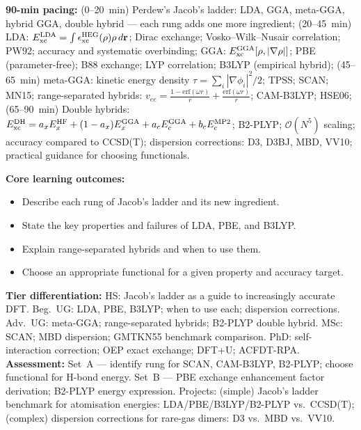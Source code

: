 \documentclass[11pt,a4paper]{article}
\begin{document}
\begin{tcolorbox}[chembox, title={Module~III.3 / L04: Overview of XC Functionals --- Jacob's Ladder}]
\textbf{90-min pacing:} (0--20~min) Perdew's Jacob's ladder: LDA, GGA, meta-GGA, hybrid GGA, double hybrid --- each rung adds one more ingredient; (20--45~min) LDA: $E_{\rm xc}^{\rm LDA}=\int\epsilon_{\rm xc}^{\rm HEG}(\rho)\rho\,d\mathbf{r}$; Dirac exchange; Vosko--Wilk--Nusair correlation; PW92; accuracy and systematic overbinding; GGA: $E_{\rm xc}^{\rm GGA}[\rho,|\nabla\rho|]$; PBE (parameter-free); B88 exchange; LYP correlation; B3LYP (empirical hybrid); (45--65~min) meta-GGA: kinetic energy density $\tau=\sum_i|\nabla\phi_i|^2/2$; TPSS; SCAN; MN15; range-separated hybrids: $v_{ee}=\tfrac{1-\text{erf}(\omega r)}{r}+\tfrac{\text{erf}(\omega r)}{r}$; CAM-B3LYP; HSE06; (65--90~min) Double hybrids: $E_{\rm xc}^{\rm DH}=a_x E_x^{\rm HF}+(1-a_x)E_x^{\rm GGA}+a_c E_c^{\rm GGA}+b_c E_c^{\rm MP2}$; B2-PLYP; $\mathcal{O}(N^5)$ scaling; accuracy compared to CCSD(T); dispersion corrections: D3, D3BJ, MBD, VV10; practical guidance for choosing functionals.

\medskip\textbf{Core learning outcomes:}
\begin{itemize}[leftmargin=1.4em,topsep=2pt,itemsep=1pt]
  \item Describe each rung of Jacob's ladder and its new ingredient.
  \item State the key properties and failures of LDA, PBE, and B3LYP.
  \item Explain range-separated hybrids and when to use them.
  \item Choose an appropriate functional for a given property and accuracy target.
\end{itemize}
\medskip\textbf{Tier differentiation:}
HS: Jacob's ladder as a guide to increasingly accurate DFT.
Beg.\ UG: LDA, PBE, B3LYP; when to use each; dispersion corrections.
Adv.\ UG: meta-GGA; range-separated hybrids; B2-PLYP double hybrid.
MSc: SCAN; MBD dispersion; GMTKN55 benchmark comparison.
PhD: self-interaction correction; OEP exact exchange; DFT+U; ACFDT-RPA.
\medskip\textbf{Assessment:}
Set~A --- identify rung for SCAN, CAM-B3LYP, B2-PLYP; choose functional for H-bond energy.
Set~B --- PBE exchange enhancement factor derivation; B2-PLYP energy expression.
Projects: (simple) Jacob's ladder benchmark for atomisation energies: LDA/PBE/B3LYP/B2-PLYP vs.\ CCSD(T); (complex) dispersion corrections for rare-gas dimers: D3 vs.\ MBD vs.\ VV10.
\end{tcolorbox}
\end{document}
